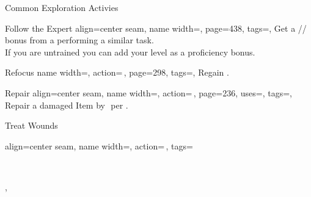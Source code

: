\renewcommand{\PageBottomReferences}{%
    \hfill APG = Advanced Players Guide
    \hfill GMC = GM Core\\
    \hfill KCG = Kingmaker Companion Guide
    \hfill SoM = Secrets of Magic
    \hfill TV = Treasure Vault
}
\setlength{\parindent}{0mm}%
\begin{PageFront}
    \begin{Tables}{\frontTableHeight}
        \begin{Table}{Common Exploration Activies}
            \begin{entry}{Follow the Expert}{%
                align=center seam,
                name width=\activityLength,%
                page=438,
                tags=\Concentrate,
            }
                Get a \E{}/\M{}/\Le{}\,\Cirm bonus from a 
                performing a similar task.\\
                If you are untrained you can add your level as a proficiency bonus.
            \end{entry}
            \begin{entry}{Refocus}{%
                name width=\activityLength,%
                action=\,,
                page=298,
                tags=\Concentrate,
            }
                Regain  .
            \end{entry}
            \begin{entry}{Repair}{%
                align=center seam,%
                name width=\activityLength,%
                action=\,,
                page=236,
                uses={\Crafting[][before=Item]},%
                tags=\Manipulate,
            }
                Repair a damaged Item by \,\HPs{}\,\HPs per .\\
                \hfill
            \end{entry}
            \begin{entry}{Treat Wounds}{%
                align=center seam,
                name width=\activityLength,%
                action=\,,
                tags=\parbox{0.4\linewidth}{\raggedleft{}\,\Manipulate\Healing\\
                },
}
\end{entry}
\end{Table}
\end{Tables}
\end{PageFront}
